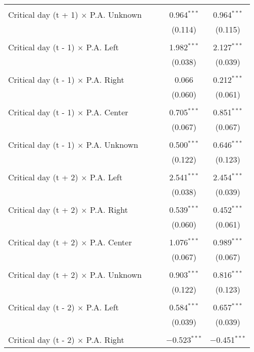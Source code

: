 \documentclass[
]{article}
\begin{document}
\begin{table}[!htbp]
{\begin{tabular}{@{\extracolsep{5pt}}lcccc}
  & & & & \\ 
 Critical day (t + 1) $\times$ P.A. Unknown &  &  & 0.964$^{***}$ & 0.964$^{***}$ \\ 
  &  &  & (0.114) & (0.115) \\ 
  & & & & \\ 
 Critical day (t - 1) $\times$ P.A. Left &  &  & 1.982$^{***}$ & 2.127$^{***}$ \\ 
  &  &  & (0.038) & (0.039) \\ 
  & & & & \\ 
 Critical day (t - 1) $\times$ P.A. Right &  &  & 0.066 & 0.212$^{***}$ \\ 
  &  &  & (0.060) & (0.061) \\ 
  & & & & \\ 
 Critical day (t - 1) $\times$ P.A. Center &  &  & 0.705$^{***}$ & 0.851$^{***}$ \\ 
  &  &  & (0.067) & (0.067) \\ 
  & & & & \\ 
 Critical day (t - 1) $\times$ P.A. Unknown &  &  & 0.500$^{***}$ & 0.646$^{***}$ \\ 
  &  &  & (0.122) & (0.123) \\ 
  & & & & \\ 
 Critical day (t + 2) $\times$ P.A. Left &  &  & 2.541$^{***}$ & 2.454$^{***}$ \\ 
  &  &  & (0.038) & (0.039) \\ 
  & & & & \\ 
 Critical day (t + 2) $\times$ P.A. Right &  &  & 0.539$^{***}$ & 0.452$^{***}$ \\ 
  &  &  & (0.060) & (0.061) \\ 
  & & & & \\ 
 Critical day (t + 2) $\times$ P.A. Center &  &  & 1.076$^{***}$ & 0.989$^{***}$ \\ 
  &  &  & (0.067) & (0.067) \\ 
  & & & & \\ 
 Critical day (t + 2) $\times$ P.A. Unknown &  &  & 0.903$^{***}$ & 0.816$^{***}$ \\ 
  &  &  & (0.122) & (0.123) \\ 
  & & & & \\ 
 Critical day (t - 2) $\times$ P.A. Left &  &  & 0.584$^{***}$ & 0.657$^{***}$ \\ 
  &  &  & (0.039) & (0.039) \\ 
  & & & & \\ 
 Critical day (t - 2) $\times$ P.A. Right &  &  & $-$0.523$^{***}$ & $-$0.451$^{***}$ \\ 

\end{tabular}}
\end{table}
\end{document}
